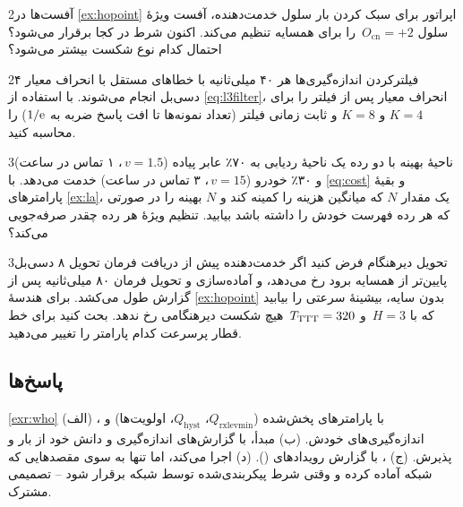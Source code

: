 \documentclass[11pt,a4paper]{article}
\begin{document}
\begin{exercisebox}{2}{آفست‌ها}\label{exr:offsets}
در \cref{ex:hopoint} اپراتور برای سبک کردن بار سلول خدمت‌دهنده، آفست ویژهٔ سلول
$O_\mathrm{cn} = +2$\, را برای همسایه تنظیم می‌کند. اکنون شرط  در کجا برقرار می‌شود؟
احتمال کدام نوع شکست بیشتر می‌شود؟
\end{exercisebox}

\begin{exercisebox}{2}{فیلترکردن}\label{exr:filter}
اندازه‌گیری‌ها هر ۴۰ میلی‌ثانیه با خطاهای مستقل با انحراف معیار ۴ دسی‌بل انجام می‌شوند. با استفاده از
\cref{eq:l3filter}، انحراف معیار پس از فیلتر را برای $K=4$ و $K=8$ و ثابت زمانی فیلتر (تعداد نمونه‌ها
تا افت پاسخ ضربه به $1/\mathrm{e}$) را محاسبه کنید.
\end{exercisebox}

\begin{exercisebox}{3}{ناحیهٔ بهینه با دو رده}\label{exr:twoclass}
یک ناحیهٔ ردیابی به ۷۰٪ عابر پیاده ($v=1.5$\,، ۱ تماس در ساعت) و ۳۰٪ خودرو ($v=15$\,،
۳ تماس در ساعت) خدمت می‌دهد. با \cref{eq:cost} و بقیهٔ پارامترهای \cref{ex:la}، یک مقدار $N$ که
میانگین هزینه را کمینه کند و $N$ بهینه را در صورتی که هر رده فهرست  خودش را داشته باشد بیابید.
تنظیم ویژهٔ هر رده چقدر صرفه‌جویی می‌کند؟
\end{exercisebox}

\begin{exercisebox}{3}{تحویل دیرهنگام}\label{exr:late}
فرض کنید اگر  خدمت‌دهنده پیش از دریافت فرمان تحویل ۸ دسی‌بل پایین‌تر از همسایه برود
 رخ می‌دهد، و آماده‌سازی و تحویل فرمان ۸۰ میلی‌ثانیه پس از گزارش طول می‌کشد. برای هندسهٔ
\cref{ex:hopoint} بدون سایه، بیشینهٔ سرعتی را بیابید که با $H = 3$\, و $T_{\mathrm{TTT}} = 320$\, هیچ
شکست دیرهنگامی رخ ندهد. بحث کنید برای خط قطار پرسرعت کدام پارامتر را تغییر می‌دهید.
\end{exercisebox}

\subsection*{پاسخ‌ها}

\begin{solutionbox}{\ref{exr:who}}
(الف) ، با پارامترهای پخش‌شده ($Q_{\mathrm{rxlevmin}}$، $Q_{\mathrm{hyst}}$، اولویت‌ها) و
اندازه‌گیری‌های خودش. (ب)  مبدأ، با گزارش‌های اندازه‌گیری  و دانش خود از بار و پذیرش.
(ج) ، با گزارش رویدادهای  (). (د)  اجرا می‌کند، اما تنها به سوی
مقصدهایی که شبکه آماده کرده و وقتی شرط پیکربندی‌شده توسط شبکه برقرار شود -- تصمیمی مشترک.
\end{solutionbox}
\end{document}

